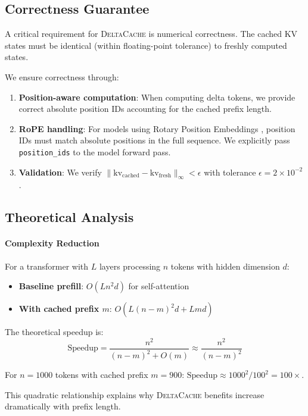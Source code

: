 \documentclass{article}
\newcommand{\deltacache}{\textsc{DeltaCache}}
\begin{document}
\subsection{Correctness Guarantee}

A critical requirement for \deltacache{} is numerical correctness.
The cached KV states must be identical (within floating-point tolerance) to freshly computed states.

We ensure correctness through:
\begin{enumerate}
    \item \textbf{Position-aware computation}: When computing delta tokens, we provide correct absolute position IDs accounting for the cached prefix length.
    \item \textbf{RoPE handling}: For models using Rotary Position Embeddings \citep{su2024roformer}, position IDs must match absolute positions in the full sequence. We explicitly pass \texttt{position\_ids} to the model forward pass.
    \item \textbf{Validation}: We verify $\|\text{kv}_\text{cached} - \text{kv}_\text{fresh}\|_\infty < \epsilon$ with tolerance $\epsilon = 2 \times 10^{-2}$.
\end{enumerate}

\subsection{Theoretical Analysis}

\paragraph{Complexity Reduction}
For a transformer with $L$ layers processing $n$ tokens with hidden dimension $d$:
\begin{itemize}
    \item \textbf{Baseline prefill}: $O(Ln^2d)$ for self-attention
    \item \textbf{With cached prefix $m$}: $O(L(n-m)^2d + Lmd)$
\end{itemize}

The theoretical speedup is:
\begin{equation}
    \text{Speedup} = \frac{n^2}{(n-m)^2 + O(m)} \approx \frac{n^2}{(n-m)^2}
\end{equation}

For $n=1000$ tokens with cached prefix $m=900$:
$\text{Speedup} \approx 1000^2 / 100^2 = 100\times$.

This quadratic relationship explains why \deltacache{} benefits increase dramatically with prefix length.
\end{document}
